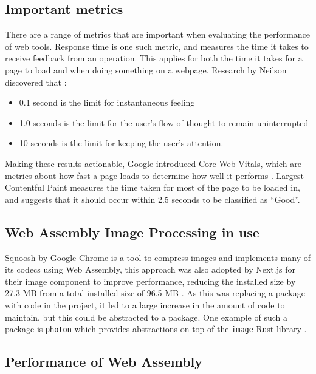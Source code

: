 \documentclass[12pt,a4paper]{article}
\begin{document}
\subsection{Important metrics}

There are a range of metrics that are important when evaluating the performance of web tools. Response time is one such metric, and measures the time it takes to receive feedback from an operation. This applies for both the time it takes for a page to load and when doing something on a webpage. Research by Neilson discovered that \cite{nielsen1994usability}:
\begin{itemize}
    \item 0.1 second is the limit for instantaneous feeling
    \item 1.0 seconds is the limit for the user's flow of thought to remain uninterrupted
    \item 10 seconds is the limit for keeping the user's attention.
\end{itemize}

Making these results actionable, Google introduced Core Web Vitals, which are metrics about how fast a page loads to determine how well it performs \cite{webvitals}. Largest Contentful Paint measures the time taken for most of the page to be loaded in, and suggests that it should occur within 2.5 seconds to be classified as “Good”.




\subsection{Web Assembly Image Processing in use}

Squoosh by Google Chrome is a tool to compress images and implements many of its codecs using Web Assembly, this approach was also adopted by Next.js for their image component to improve performance, reducing the installed size by 27.3 MB from a total installed size of 96.5 MB \cite{nextjs}. As this was replacing a package with code in the project, it led to a large increase in the amount of code to maintain, but this could be abstracted to a package. One example of such a package is \texttt{photon} which provides abstractions on top of the \texttt{image} Rust library \cite{photon}.




\subsection{Performance of Web Assembly}
\end{document}
